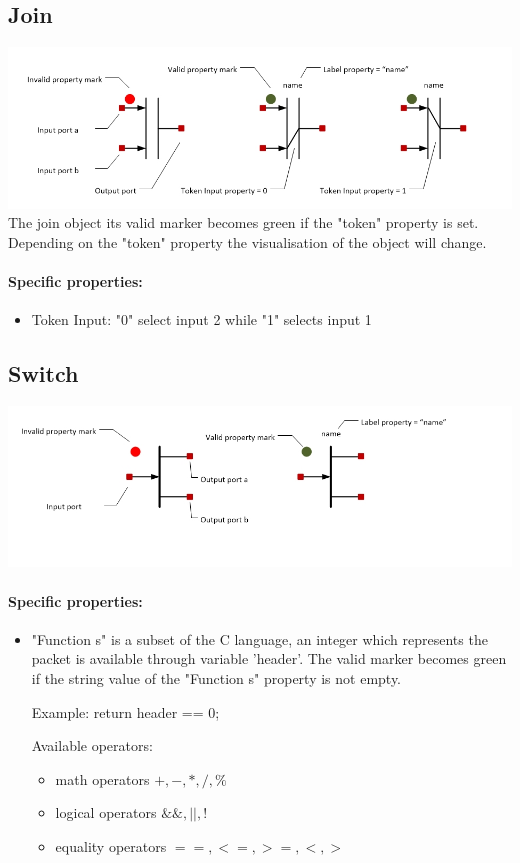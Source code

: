 \documentclass[a4paper,11pt,final]{article}
\begin{document}
\subsection{Join}
\includegraphics[width=1.0\textwidth]{join}
The join object its valid marker becomes green if the "token" property is set. Depending on the "token" property the visualisation of the object will change.
\paragraph{Specific properties:}
\begin{itemize}
\item Token Input: "0" select input 2 while "1" selects input 1
\end{itemize}


\subsection{Switch}
\includegraphics[width=1.0\textwidth]{switch}
\paragraph{Specific properties:}
\begin{itemize}
\item "Function s" is a subset of the C language, an integer which represents the packet is available through variable 'header'.
The valid marker becomes green if the  string value of the "Function s" property is not empty.

Example: return header == 0;

Available operators:
\begin{itemize}
\item math operators $+,-,*,/,\%$
\item logical operators $\&\&,||,!$
\item equality operators $==,<=,>=,<,>$
\end{itemize}
\end{itemize}
\end{document}
